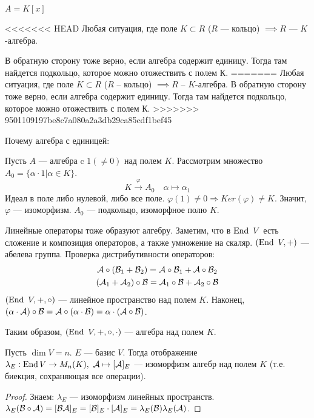 \documentclass[main]{subfiles}
\begin{document}
\begin{example}
    $A = K[x]$
\end{example}   
\begin{example}
<<<<<<< HEAD
    Любая ситуация, где поле $K \subset R$ ($R$ —  кольцо) $\implies R$ — $K$-алгебра. 
    
    В обратную сторону тоже верно, если алгебра содержит единицу. Тогда там найдется подкольцо, которое можно отожествить с полем К.
=======
    Любая ситуация, где поле $K \subset R$ ($R$ -- кольцо) $\implies R$ -- $K$-алгебра. 
    В обратную сторону тоже верно, если алгебра содержит единицу. Тогда там найдется подкольцо, которое можно отожествить с полем $К$.
>>>>>>> 9501109197be8c7a080a2a3db29ca85cdf1bef45
    
    Почему алгебра с единицей: 

    Пусть $A$ —  алгебра c $1(\neq0)$ над полем $K$.
    Рассмотрим множество $A_0 = \{\alpha \cdot 1| \alpha \in K\}$. 
    \[K \xrightarrow{\varphi} A_0 \quad \alpha \mapsto \alpha_1\]
    Идеал в поле либо нулевой, либо все поле. 
    $\varphi(1) \neq 0 \Rightarrow Ker(\varphi)\neq K$. 
    Значит,  $\varphi$ — изоморфизм. $A_0$ — подкольцо, изоморфное полю $K$.
\end{example}


Линейные операторы тоже образуют алгебру. Заметим, что в $\operatorname{End} \ V$ есть сложение и композиция операторов, а также умножение на скаляр. 
$(\operatorname{End} \ V, +)$ — абелева группа. Проверка дистрибутивности операторов:
\begin{gather*}
    \mathcal{A}\circ(\mathcal{B}_1+\mathcal{B}_2) = \mathcal{A}\circ\mathcal{B}_1 + \mathcal{A}\circ\mathcal{B}_2 \\
    (\mathcal{A}_1 + \mathcal{A}_2)\circ\mathcal{B} = \mathcal{A}_1\circ\mathcal{B}+\mathcal{A}_2\circ\mathcal{B}
\end{gather*}
$(\operatorname{End} \ V, +, \circ)$ — линейное пространство над полем $K$. Наконец,
$(\alpha\cdot\mathcal{A})\circ\mathcal{B}=\mathcal{A}\circ(\alpha\cdot\mathcal{B})=\alpha\cdot(\mathcal{A}\circ\mathcal{B})$.
 
Таким образом, $(\operatorname{End} \ V, +, \circ, \cdot)$ — алгебра над полем $K$.




\begin{proposition}
Пусть $\dim V = n$. $E$ — базис $V$. 
Тогда отображение $\lambda_E : \operatorname{End} V \rightarrow M_n(K), \ \mathcal{A} \mapsto [\mathcal{A}]_E$ — изоморфизм алгебр над полем $K$ (т.е. биекция, сохраняющая все операции).
\end{proposition}

\begin{proof}
    Знаем: $\lambda_E$ — изоморфизм линейных пространств. $\lambda_E(\mathcal{B}\circ\mathcal{A})=[\mathcal{B}\mathcal{A}]_E=[\mathcal{B}]_E\cdot[\mathcal{A}]_E = \lambda_E(\mathcal{B})\lambda_E(\mathcal{A})$.
\end{proof}
\end{document}
